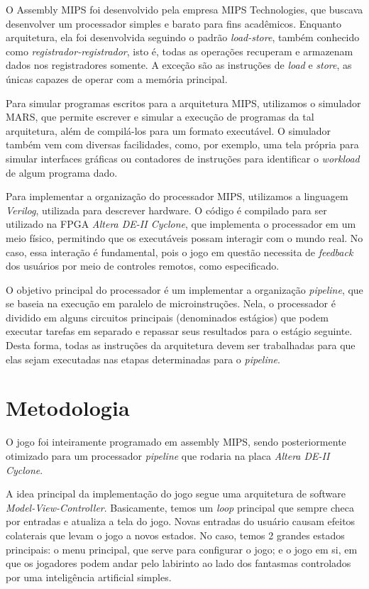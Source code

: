 \documentclass[12pt, a4paper, twocolumn]{article}
\begin{document}
O Assembly MIPS foi desenvolvido pela empresa MIPS Technologies, que buscava desenvolver um processador simples e barato para fins acadêmicos. Enquanto arquitetura, ela foi desenvolvida seguindo o padrão \textit{load-store}, também conhecido como \textit{registrador-registrador}, isto é, todas as operações recuperam e armazenam dados nos registradores somente. A exceção são as instruções de \textit{load} e \textit{store}, as únicas capazes de operar com a memória principal.

Para simular programas escritos para a arquitetura MIPS, utilizamos o simulador MARS, que permite escrever e simular a execução de programas da tal arquitetura, além de compilá-los para um formato executável. O simulador também vem com diversas facilidades, como, por exemplo, uma tela própria para simular interfaces gráficas ou contadores de instruções para identificar o \textit{workload} de algum programa dado.

Para implementar a organização do processador MIPS, utilizamos a linguagem \textit{Verilog}, utilizada para descrever hardware. O código é compilado para ser utilizado na FPGA \textit{Altera DE-II Cyclone}, que implementa o processador em um meio físico, permitindo que os executáveis possam interagir com o mundo real. No caso, essa interação é fundamental, pois o jogo em questão necessita de \textit{feedback} dos usuários por meio de controles remotos, como especificado.

O objetivo principal do processador é um implementar a organização \textit{pipeline}, que se baseia na execução em paralelo de microinstruções. Nela, o processador é dividido em alguns circuitos principais (denominados  estágios) que podem executar tarefas em separado e repassar seus resultados para o estágio seguinte. Desta forma, todas as instruções da arquitetura devem ser trabalhadas para que elas sejam executadas nas etapas determinadas para o \textit{pipeline}.


\section{Metodologia}

O jogo foi inteiramente programado em assembly MIPS, sendo posteriormente otimizado para um processador \textit{pipeline} que rodaria na placa \textit{Altera DE-II Cyclone}. 

A idea principal da implementação do jogo segue uma arquitetura de software \textit{Model-View-Controller}. Basicamente, temos um \textit{loop} principal que sempre checa por entradas e atualiza a tela do jogo. Novas entradas do usuário causam efeitos colaterais que levam o jogo a novos estados. No caso, temos 2 grandes estados principais: o menu principal, que serve para configurar o jogo; e o jogo em si, em que os jogadores podem andar pelo labirinto ao lado dos fantasmas controlados por uma inteligência artificial simples.
\end{document}
